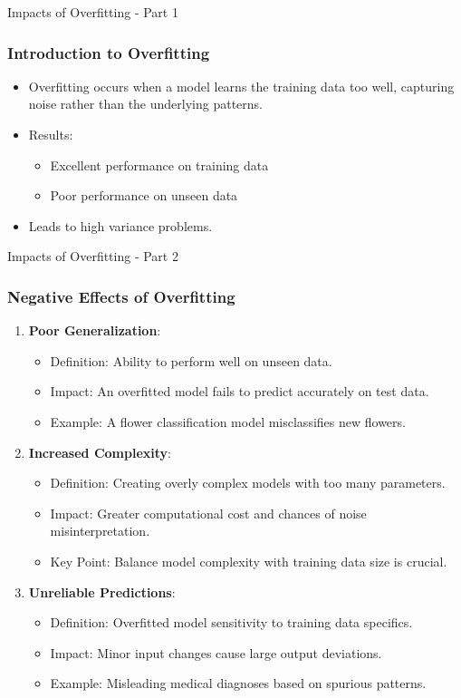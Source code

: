 \documentclass[aspectratio=169]{beamer}
\begin{document}
\begin{frame}[fragile]{Impacts of Overfitting - Part 1}
    \frametitle{Introduction to Overfitting}
    \begin{itemize}
        \item Overfitting occurs when a model learns the training data too well, capturing noise rather than the underlying patterns.
        \item Results:
            \begin{itemize}
                \item Excellent performance on training data 
                \item Poor performance on unseen data
            \end{itemize}
        \item Leads to high variance problems.
    \end{itemize}
\end{frame}

\begin{frame}[fragile]{Impacts of Overfitting - Part 2}
    \frametitle{Negative Effects of Overfitting}
    \begin{enumerate}
        \item \textbf{Poor Generalization}:
            \begin{itemize}
                \item Definition: Ability to perform well on unseen data.
                \item Impact: An overfitted model fails to predict accurately on test data.
                \item Example: A flower classification model misclassifies new flowers.
            \end{itemize}

        \item \textbf{Increased Complexity}:
            \begin{itemize}
                \item Definition: Creating overly complex models with too many parameters.
                \item Impact: Greater computational cost and chances of noise misinterpretation.
                \item Key Point: Balance model complexity with training data size is crucial.
            \end{itemize}

        \item \textbf{Unreliable Predictions}:
            \begin{itemize}
                \item Definition: Overfitted model sensitivity to training data specifics.
                \item Impact: Minor input changes cause large output deviations.
                \item Example: Misleading medical diagnoses based on spurious patterns.
            \end{itemize}
    \end{enumerate}
\end{frame}
\end{document}
